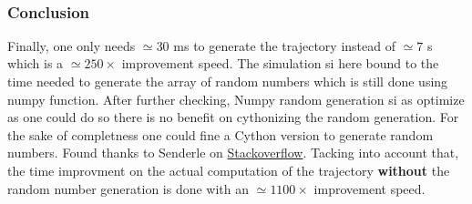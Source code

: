 \documentclass[11pt]{article}
\begin{document}
    \begin{center}
    \end{center}
    { \hspace*{\fill} \\}
    
    \hypertarget{conclusion}{%
\subsubsection{Conclusion}\label{conclusion}}

Finally, one only needs \(\simeq 30\) ms to generate the trajectory
instead of \(\simeq 7\) s which is a \(\simeq 250\times\) improvement
speed. The simulation si here bound to the time needed to generate the
array of random numbers which is still done using numpy function. After
further checking, Numpy random generation si as optimize as one could do
so there is no benefit on cythonizing the random generation. For the
sake of completness one could fine a Cython version to generate random
numbers. Found thanks to Senderle on
\href{https://stackoverflow.com/questions/42767816/what-is-the-most-efficient-and-portable-way-to-generate-gaussian-random-numbers}{Stackoverflow}.
Tacking into account that, the time improvment on the actual computation
of the trajectory \textbf{without} the random number generation is done
with an \(\simeq 1100\times\) improvement speed.
\end{document}
